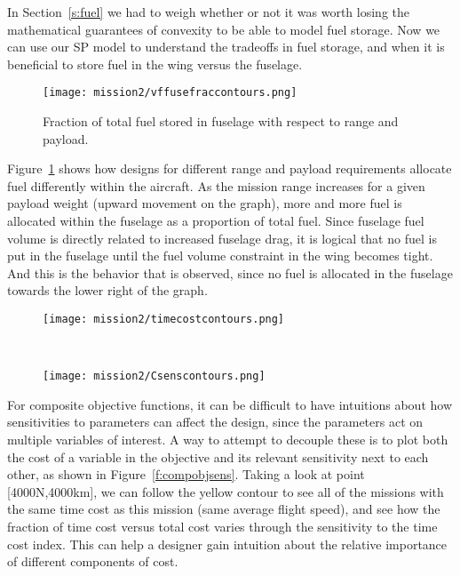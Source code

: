 In Section~\ref{s:fuel} we had to weigh whether or not it was worth losing the mathematical
guarantees of convexity to be able to model fuel storage. Now we can use our \gls{SP} model to understand
the tradeoffs in fuel storage, and when it is beneficial to store fuel in the wing versus the fuselage.

\begin{figure}
    \centering
    \texttt{[image: mission2/vffusefraccontours.png]}
    \caption{Fraction of total fuel stored in fuselage with respect to range and payload.}
    \label{f:fusefuelfrac}
\end{figure}

Figure~\ref{f:fusefuelfrac} shows how designs for different range and payload requirements
allocate fuel differently within the aircraft. As the mission range increases for a given payload weight
(upward movement on the graph),
more and more fuel is allocated within the fuselage as a proportion of total fuel. Since fuselage fuel
volume is directly related to increased fuselage drag, it is logical that no fuel is put in the fuselage
until the fuel volume constraint in the wing becomes tight. And this is the behavior that is observed,
since no fuel is allocated in the fuselage towards the lower right of the graph.

\begin{figure*}[t!]
    \centering
    \begin{subfigure}[t]{0.5\linewidth}
        \centering
        \texttt{[image: mission2/timecostcontours.png]}
    \end{subfigure}%
    ~
    \begin{subfigure}[t]{0.5\linewidth}
        \centering
        \texttt{[image: mission2/Csenscontours.png]}
    \end{subfigure}
    \caption[Time cost and time cost index sensitivity contours.]{Time cost and time cost index sensitivity contours.
    We can gain intuition about the relative importance of different components
    of composite objective functions by showing both the costs and their sensitivities together.}
    \label{f:compobjsens}
\end{figure*}

For composite objective functions, it can be difficult to have intuitions about how sensitivities
to parameters can affect the design, since the parameters act on multiple variables of interest. A way
to attempt to decouple these is to plot both the cost of a variable in the objective and its relevant
sensitivity next to each other, as shown in Figure~\ref{f:compobjsens}. Taking a look at point [4000N,4000km],
we can follow the yellow contour to see all of the missions with the same time cost as this mission
(same average flight speed),
and see how the fraction of time cost versus total cost varies through the sensitivity to the time cost index.
This can help a designer gain intuition about the relative importance of different components of cost.

